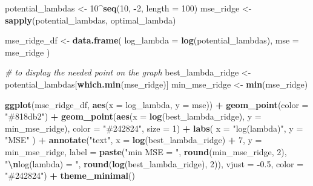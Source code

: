 \documentclass[
]{article}
\newenvironment{Shaded}{\begin{snugshade}}{\end{snugshade}}
\newcommand{\AttributeTok}[1]{\textcolor[rgb]{0.13,0.29,0.53}{#1}}
\newcommand{\CommentTok}[1]{\textcolor[rgb]{0.56,0.35,0.01}{\textit{#1}}}
\newcommand{\DecValTok}[1]{\textcolor[rgb]{0.00,0.00,0.81}{#1}}
\newcommand{\FloatTok}[1]{\textcolor[rgb]{0.00,0.00,0.81}{#1}}
\newcommand{\FunctionTok}[1]{\textcolor[rgb]{0.13,0.29,0.53}{\textbf{#1}}}
\newcommand{\NormalTok}[1]{#1}
\newcommand{\OtherTok}[1]{\textcolor[rgb]{0.56,0.35,0.01}{#1}}
\newcommand{\SpecialCharTok}[1]{\textcolor[rgb]{0.81,0.36,0.00}{\textbf{#1}}}
\newcommand{\StringTok}[1]{\textcolor[rgb]{0.31,0.60,0.02}{#1}}
\begin{document}
\begin{Shaded}
\begin{Highlighting}[]
\NormalTok{potential\_lambdas }\OtherTok{\textless{}{-}} \DecValTok{10}\SpecialCharTok{\^{}}\FunctionTok{seq}\NormalTok{(}\DecValTok{10}\NormalTok{, }\SpecialCharTok{{-}}\DecValTok{2}\NormalTok{, }\AttributeTok{length =} \DecValTok{100}\NormalTok{)}
\NormalTok{mse\_ridge }\OtherTok{\textless{}{-}} \FunctionTok{sapply}\NormalTok{(potential\_lambdas, optimal\_lambda)}

\NormalTok{mse\_ridge\_df }\OtherTok{\textless{}{-}} \FunctionTok{data.frame}\NormalTok{(}
  \AttributeTok{log\_lambda =} \FunctionTok{log}\NormalTok{(potential\_lambdas),}
  \AttributeTok{mse =}\NormalTok{ mse\_ridge}
\NormalTok{)}

\CommentTok{\# to display the needed point on the graph}
\NormalTok{best\_lambda\_ridge }\OtherTok{\textless{}{-}}\NormalTok{ potential\_lambdas[}\FunctionTok{which.min}\NormalTok{(mse\_ridge)]}
\NormalTok{min\_mse\_ridge }\OtherTok{\textless{}{-}} \FunctionTok{min}\NormalTok{(mse\_ridge)}

\FunctionTok{ggplot}\NormalTok{(mse\_ridge\_df, }\FunctionTok{aes}\NormalTok{(}\AttributeTok{x =}\NormalTok{ log\_lambda, }\AttributeTok{y =}\NormalTok{ mse)) }\SpecialCharTok{+}
  \FunctionTok{geom\_point}\NormalTok{(}\AttributeTok{color =} \StringTok{"\#818db2"}\NormalTok{) }\SpecialCharTok{+}
  \FunctionTok{geom\_point}\NormalTok{(}\FunctionTok{aes}\NormalTok{(}\AttributeTok{x =} \FunctionTok{log}\NormalTok{(best\_lambda\_ridge), }\AttributeTok{y =}\NormalTok{ min\_mse\_ridge), }\AttributeTok{color =} \StringTok{"\#242824"}\NormalTok{, }\AttributeTok{size =} \DecValTok{1}\NormalTok{) }\SpecialCharTok{+}
  \FunctionTok{labs}\NormalTok{(}
    \AttributeTok{x =} \StringTok{"log(lambda)"}\NormalTok{,}
    \AttributeTok{y =} \StringTok{"MSE"}
\NormalTok{  ) }\SpecialCharTok{+}
  \FunctionTok{annotate}\NormalTok{(}\StringTok{"text"}\NormalTok{, }\AttributeTok{x =} \FunctionTok{log}\NormalTok{(best\_lambda\_ridge) }\SpecialCharTok{+} \DecValTok{7}\NormalTok{, }\AttributeTok{y =}\NormalTok{ min\_mse\_ridge,}
           \AttributeTok{label =} \FunctionTok{paste}\NormalTok{(}\StringTok{"min MSE = "}\NormalTok{, }\FunctionTok{round}\NormalTok{(min\_mse\_ridge, }\DecValTok{2}\NormalTok{),}
                         \StringTok{"}\SpecialCharTok{\textbackslash{}n}\StringTok{log(lambda) = "}\NormalTok{, }\FunctionTok{round}\NormalTok{(}\FunctionTok{log}\NormalTok{(best\_lambda\_ridge), }\DecValTok{2}\NormalTok{)),}
           \AttributeTok{vjust =} \SpecialCharTok{{-}}\FloatTok{0.5}\NormalTok{, }\AttributeTok{color =} \StringTok{"\#242824"}\NormalTok{) }\SpecialCharTok{+}
  \FunctionTok{theme\_minimal}\NormalTok{()}
\end{Highlighting}
\end{Shaded}
\end{document}
